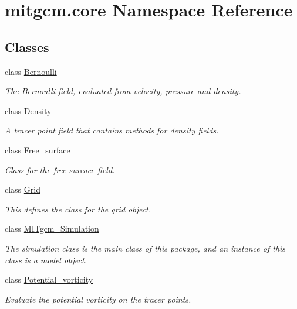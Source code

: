 \hypertarget{namespacemitgcm_1_1core}{}\section{mitgcm.\+core Namespace Reference}
\label{namespacemitgcm_1_1core}
\subsection*{Classes}
\begin{DoxyCompactItemize}
\item 
class \hyperlink{classmitgcm_1_1core_1_1Bernoulli}{Bernoulli}
\begin{DoxyCompactList}\small\item\em The \hyperlink{classmitgcm_1_1core_1_1Bernoulli}{Bernoulli} field, evaluated from velocity, pressure and density. \end{DoxyCompactList}\item 
class \hyperlink{classmitgcm_1_1core_1_1Density}{Density}
\begin{DoxyCompactList}\small\item\em A tracer point field that contains methods for density fields. \end{DoxyCompactList}\item 
class \hyperlink{classmitgcm_1_1core_1_1Free__surface}{Free\+\_\+surface}
\begin{DoxyCompactList}\small\item\em Class for the free surcace field. \end{DoxyCompactList}\item 
class \hyperlink{classmitgcm_1_1core_1_1Grid}{Grid}
\begin{DoxyCompactList}\small\item\em This defines the class for the grid object. \end{DoxyCompactList}\item 
class \hyperlink{classmitgcm_1_1core_1_1MITgcm__Simulation}{M\+I\+Tgcm\+\_\+\+Simulation}
\begin{DoxyCompactList}\small\item\em The simulation class is the main class of this package, and an instance of this class is a model object. \end{DoxyCompactList}\item 
class \hyperlink{classmitgcm_1_1core_1_1Potential__vorticity}{Potential\+\_\+vorticity}
\begin{DoxyCompactList}\small\item\em Evaluate the potential vorticity on the tracer points. \end{DoxyCompactList}\item 

\end{DoxyCompactItemize}
